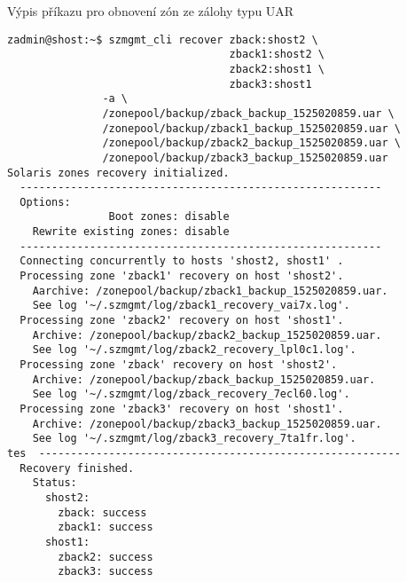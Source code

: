 \begin{listing}[ht]
  \caption{Výpis příkazu pro obnovení zón ze zálohy typu UAR}
  \label{code:test:recovery}
  \begin{verbatim}
zadmin@shost:~$ szmgmt_cli recover zback:shost2 \
                                   zback1:shost2 \
                                   zback2:shost1 \
                                   zback3:shost1 
               -a \ 
               /zonepool/backup/zback_backup_1525020859.uar \
               /zonepool/backup/zback1_backup_1525020859.uar \
               /zonepool/backup/zback2_backup_1525020859.uar \
               /zonepool/backup/zback3_backup_1525020859.uar
Solaris zones recovery initialized.
  ---------------------------------------------------------
  Options:
                Boot zones: disable
    Rewrite existing zones: disable
  ---------------------------------------------------------
  Connecting concurrently to hosts 'shost2, shost1' .
  Processing zone 'zback1' recovery on host 'shost2'.
    Aarchive: /zonepool/backup/zback1_backup_1525020859.uar.
    See log '~/.szmgmt/log/zback1_recovery_vai7x.log'.
  Processing zone 'zback2' recovery on host 'shost1'.
    Archive: /zonepool/backup/zback2_backup_1525020859.uar.
    See log '~/.szmgmt/log/zback2_recovery_lpl0c1.log'.
  Processing zone 'zback' recovery on host 'shost2'.
    Archive: /zonepool/backup/zback_backup_1525020859.uar.
    See log '~/.szmgmt/log/zback_recovery_7ecl60.log'.
  Processing zone 'zback3' recovery on host 'shost1'.
    Archive: /zonepool/backup/zback3_backup_1525020859.uar.
    See log '~/.szmgmt/log/zback3_recovery_7ta1fr.log'.
tes  ---------------------------------------------------------
  Recovery finished.
    Status:
      shost2:
        zback: success
        zback1: success
      shost1:
        zback2: success
        zback3: success
  \end{verbatim}
\end{listing}